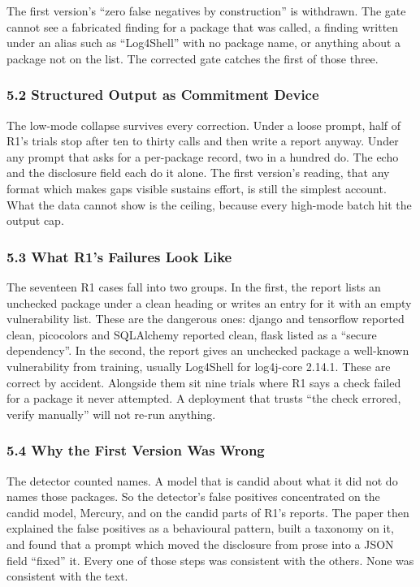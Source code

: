 \documentclass[
]{article}
\begin{document}
The first version's ``zero false negatives by construction'' is
withdrawn. The gate cannot see a fabricated finding for a package that
was called, a finding written under an alias such as ``Log4Shell'' with
no package name, or anything about a package not on the list. The
corrected gate catches the first of those three.

\subsubsection{5.2 Structured Output as Commitment
Device}\label{structured-output-as-commitment-device}

The low-mode collapse survives every correction. Under a loose prompt,
half of R1's trials stop after ten to thirty calls and then write a
report anyway. Under any prompt that asks for a per-package record, two
in a hundred do. The echo and the disclosure field each do it alone. The
first version's reading, that any format which makes gaps visible
sustains effort, is still the simplest account. What the data cannot
show is the ceiling, because every high-mode batch hit the output cap.

\subsubsection{5.3 What R1's Failures Look
Like}\label{what-r1s-failures-look-like}

The seventeen R1 cases fall into two groups. In the first, the report
lists an unchecked package under a clean heading or writes an entry for
it with an empty vulnerability list. These are the dangerous ones:
django and tensorflow reported clean, picocolors and SQLAlchemy reported
clean, flask listed as a ``secure dependency''. In the second, the
report gives an unchecked package a well-known vulnerability from
training, usually Log4Shell for log4j-core 2.14.1. These are correct by
accident. Alongside them sit nine trials where R1 says a check failed
for a package it never attempted. A deployment that trusts ``the check
errored, verify manually'' will not re-run anything.

\subsubsection{5.4 Why the First Version Was
Wrong}\label{why-the-first-version-was-wrong}

The detector counted names. A model that is candid about what it did not
do names those packages. So the detector's false positives concentrated
on the candid model, Mercury, and on the candid parts of R1's reports.
The paper then explained the false positives as a behavioural pattern,
built a taxonomy on it, and found that a prompt which moved the
disclosure from prose into a JSON field ``fixed'' it. Every one of those
steps was consistent with the others. None was consistent with the text.
\end{document}
